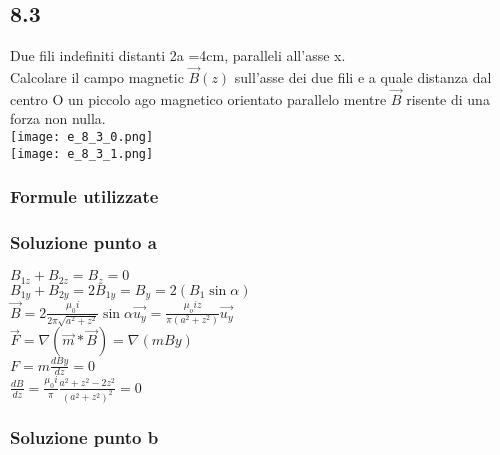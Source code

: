 \documentclass[../../main.tex]{subfiles}
\begin{document}
\subsection*{8.3}
Due fili indefiniti distanti 2a =4cm, paralleli all'asse x.
\\Calcolare il campo magnetic $\vec{B}(z)$ sull'asse dei due fili e a quale distanza dal centro O un piccolo ago magnetico orientato parallelo mentre $\vec{B}$ risente di una forza non nulla.
\\\texttt{[image: e\_8\_3\_0.png]}
\\\texttt{[image: e\_8\_3\_1.png]}
\subsubsection*{Formule utilizzate}
\subsubsection*{Soluzione punto a}
$B_{1z}+B_{2z} = B_z = 0$
\\$B_{1y} + B_{2y} = 2B_{1y} = B_y = 2(B_1\sin\alpha)$
\\$\vec{B}=2\frac{\mu_0 i}{2\pi\sqrt{a^2+z^2}}\sin\alpha\vec{u_y} = \frac{\mu_o i z}{\pi(a^2+z^2)}\vec{u_y}$
\\$\vec{F}=\nabla(\vec{m} * \vec{B})=\nabla(mBy)$
\\$F=m\frac{dBy}{dz}=0$
\\$\frac{dB}{dz}=\frac{\mu_0 i}{\pi}\frac{a^2+z^2-2z^2}{(a^2+z^2)^2} = 0$
\subsubsection*{Soluzione punto b}
\newpage
\end{document}
